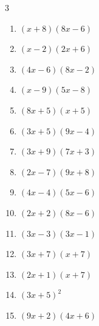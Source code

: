 \begin{multicols}{3}
\begin{enumerate}
  \item $(x+8)(8x-6)$


  \item $(x-2)(2x+6)$


  \item $(4x-6)(8x-2)$


  \item $(x-9)(5x-8)$


  \item $(8x+5)(x+5)$


  \item $(3x+5)(9x-4)$


  \item $(3x+9)(7x+3)$


  \item $(2x-7)(9x+8)$


  \item $(4x-4)(5x-6)$


  \item $(2x+2)(8x-6)$


  \item $(3x-3)(3x-1)$


  \item $(3x+7)(x+7)$


\columnbreak %

  \item $(2x+1)(x+7)$


  \item $(3x+5)^{2}$


  \item $(9x+2)(4x+6)$


\end{enumerate}
\end{multicols}
